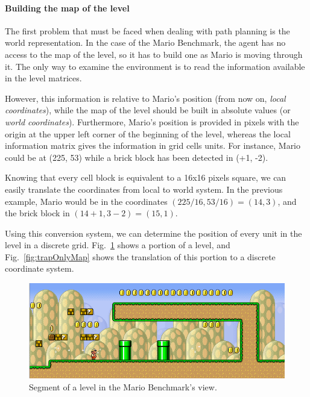 \documentclass[conference]{IEEEtran}
\begin{document}
\paragraph{Building the map of the level}

The first problem that must be faced when dealing with path planning is 
the world representation. In the case of the Mario Benchmark, the agent has
no access to the map of the level, so it has to build one as Mario
is moving through it. The only way to examine the 
environment is to read the information available in the level matrices.

However, this information is relative to Mario's position (from now on, \textit{local
coordinates}), while the map of the level should be built in absolute values
(or \textit{world coordinates}). Furthermore, Mario's position is provided in pixels
with the origin at the upper left corner of the beginning of the level, whereas the 
local information matrix gives the information in grid cells units. For instance, Mario 
could be at (225, 53) while a brick block has been detected in (+1, -2).

Knowing that every cell block is equivalent to a 16x16 pixels square, we can 
easily translate the coordinates from local to world system. In the 
previous example, Mario would be in the coordinates $(225/16, 53/16) = 
(14,3)$, and the brick block in $(14+1, 3-2) = (15,1)$.

Using this conversion system, we can determine the position of every unit in the
level in a discrete grid. Fig.~\ref{fig:trap} shows a portion of a level, and 
Fig.~\ref{fig:trapOnlyMap} shows the translation of this portion to a 
discrete coordinate system.


\begin{figure} [ht]
	\begin{center}
	\includegraphics[scale=0.45]{images/trap}
	\caption{Segment of a level in the Mario Benchmark's view.}
	\label{fig:trap}
	\end{center}
\end{figure}
\end{document}
